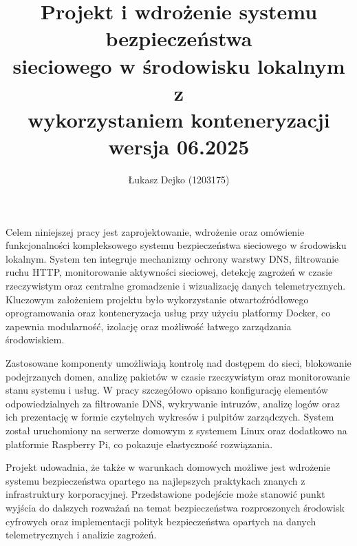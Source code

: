 \documentclass[
    left=2.5cm,         %
    right=2.5cm,        %
    top=2.5cm,          %
    bottom=3cm,         %
    bindingoffset=6mm,  %
    nohyphenation=true %
]{eiti/eiti-thesis} %
\begin{document}
\EngineerThesis
{}

\title{
    Projekt i wdrożenie systemu bezpieczeństwa \\ 
    sieciowego w środowisku lokalnym z \\
    wykorzystaniem konteneryzacji \\
    wersja 06.2025
}


\author{Łukasz Dejko (1203175)}


\date{\the\year}
\maketitle

\streszczenie Celem niniejszej pracy jest zaprojektowanie, wdrożenie oraz omówienie funkcjonalności kompleksowego systemu bezpieczeństwa sieciowego w środowisku lokalnym. System ten integruje mechanizmy ochrony warstwy DNS, filtrowanie ruchu HTTP, monitorowanie aktywności sieciowej, detekcję zagrożeń w czasie rzeczywistym oraz centralne gromadzenie i wizualizację danych telemetrycznych. Kluczowym założeniem projektu było wykorzystanie otwartoźródłowego oprogramowania oraz konteneryzacja usług przy użyciu platformy Docker, co zapewnia modularność, izolację oraz możliwość łatwego zarządzania środowiskiem.

Zastosowane komponenty umożliwiają kontrolę nad dostępem do sieci, blokowanie podejrzanych domen, analizę pakietów w czasie rzeczywistym oraz monitorowanie stanu systemu i usług. W pracy szczegółowo opisano konfigurację elementów odpowiedzialnych za filtrowanie DNS, wykrywanie intruzów, analizę logów oraz ich prezentację w formie czytelnych wykresów i pulpitów zarządczych. System został uruchomiony na serwerze domowym z systemem Linux oraz dodatkowo na platformie Raspberry Pi, co pokazuje elastyczność rozwiązania.

Projekt udowadnia, że także w warunkach domowych możliwe jest wdrożenie systemu bezpieczeństwa opartego na najlepszych praktykach znanych z infrastruktury korporacyjnej. Przedstawione podejście może stanowić punkt wyjścia do dalszych rozważań na temat bezpieczeństwa rozproszonych środowisk cyfrowych oraz implementacji polityk bezpieczeństwa opartych na danych telemetrycznych i analizie zagrożeń.
\end{document}
